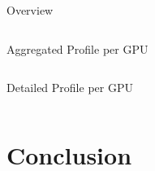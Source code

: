 \documentclass[compress,aspectratio=169]{beamer}
\begin{document}
\begin{frame}[fragile]{Overview}
        \footnotesize\inputminted[xleftmargin=1em,linenos,fontsize=\scriptsize, firstline=1,lastline=16]{python}{../../data/scap_gtx1080_deepspeed_14615344_4294967294_one-epoch.txt}

\end{frame}

\begin{frame}[fragile]{Aggregated Profile per GPU}
        \footnotesize\inputminted[xleftmargin=1em,linenos,fontsize=\scriptsize, firstline=18,lastline=31]{python}{../../data/scap_gtx1080_deepspeed_14615344_4294967294_one-epoch.txt}

\end{frame}

\begin{frame}[fragile]{Detailed Profile per GPU}
        \footnotesize\inputminted[xleftmargin=1em,linenos,fontsize=\tiny, firstline=33,lastline=48, breaklines]{python}{../../data/scap_gtx1080_deepspeed_14615344_4294967294_one-epoch.txt}

\end{frame}




\section{Conclusion}
\sectionIntro %
\end{document}
